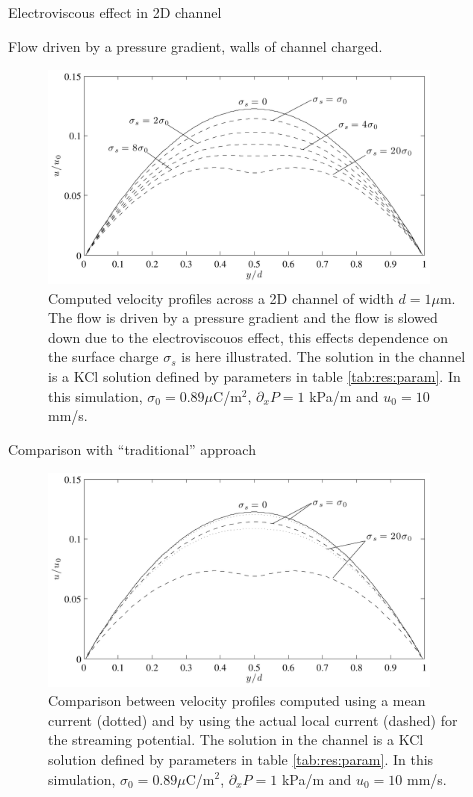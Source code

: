 \begin{frame}{Electroviscous effect in 2D channel}

Flow driven by a pressure gradient, walls of channel charged.

\begin{figure}
\begin{center}
\includegraphics[width=0.9\textwidth]{../fig/electrovisc.pdf}
\end{center}
\caption{Computed velocity profiles across a 2D channel of width $d =
  1 \mu$m. The flow is driven by a pressure gradient and the flow is
  slowed down due to the electroviscouos effect, this effects
  dependence on the surface charge $\sigma_s$ is here illustrated. The
  solution in the channel is a KCl solution defined by parameters in
  table \ref{tab:res:param}. In this simulation, $\sigma_0 = 0.89
  \mu$C/m$^2$, $\partial_xP = 1$ kPa/m and $u_0 = 10$ mm/s. }
\label{fig:res:ev}
\end{figure}
\end{frame}

\begin{frame}{Comparison with ``traditional'' approach}


\begin{figure}
\begin{center}
\includegraphics[width=0.9\textwidth]{../fig/electrovisc_comp.pdf}
\end{center}
\caption{Comparison between velocity profiles computed using a mean
  current (dotted) and by using the actual local current (dashed) for
  the streaming potential. The solution in the channel is a KCl
  solution defined by parameters in table \ref{tab:res:param}. In this
  simulation, $\sigma_0 = 0.89 \mu$C/m$^2$, $\partial_xP = 1$ kPa/m
  and $u_0 = 10$ mm/s. }
\label{fig:res:ev_comp}
\end{figure}

\end{frame}


